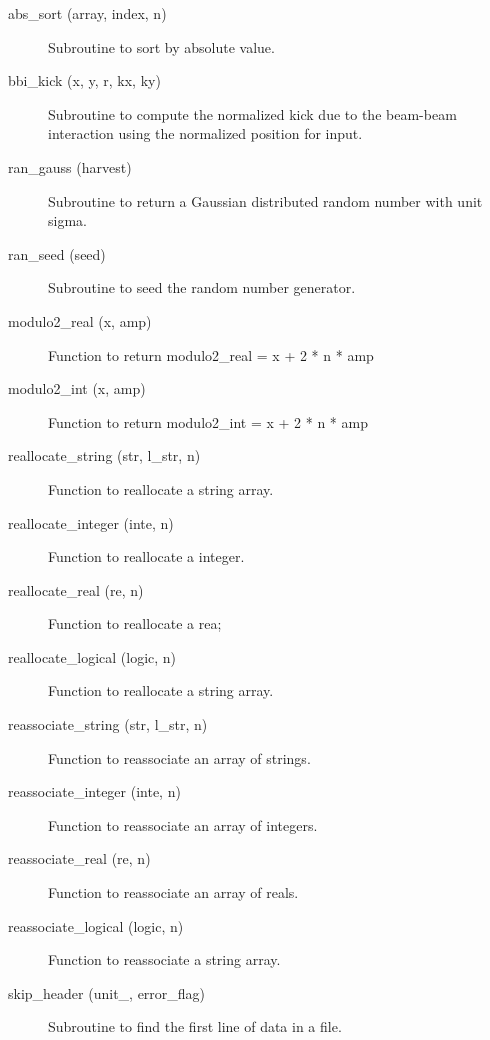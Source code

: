 \begin{description}

\item[abs\_sort (array, index, n)] \Newline 
  Subroutine to sort by absolute value.

\item[bbi\_kick (x, y, r, kx, ky)] \Newline 
Subroutine to compute the normalized kick due to the beam-beam
interaction using the normalized position for input.

\item[ran\_gauss (harvest)] \Newline 
Subroutine to return a Gaussian distributed random number with unit sigma.

\item[ran\_seed (seed)] \Newline 
Subroutine to seed the random number generator. 

\item[modulo2\_real (x, amp)] \Newline 
Function to return
modulo2\_real = x + 2 * n * amp

\item[modulo2\_int (x, amp)] \Newline 
Function to return
modulo2\_int = x + 2 * n * amp

\item[reallocate\_string (str, l\_str, n)] \Newline 
Function to reallocate a string array.

\item[reallocate\_integer (inte, n)] \Newline 
Function to reallocate a integer.

\item[reallocate\_real (re, n)] \Newline 
Function to reallocate a rea;

\item[reallocate\_logical (logic, n)] \Newline 
Function to reallocate a string array.

\item[reassociate\_string (str, l\_str, n)] \Newline 
Function to reassociate an array of strings.

\item[reassociate\_integer (inte, n)] \Newline 
Function to reassociate an array of integers.

\item[reassociate\_real (re, n)] \Newline 
Function to reassociate an array of reals.

\item[reassociate\_logical (logic, n)] \Newline 
Function to reassociate a string array.

\item[skip\_header (unit\_, error\_flag)] \Newline 
Subroutine to find the first line of data in a file. 


\end{description}
